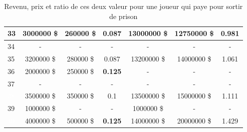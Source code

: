 \documentclass[letterpaper]{article}
\begin{document}
\begin{table}[htbp!]
\begin{tabular}{|l|c|c|c||c|c|c|}
	  \cellcolor[HTML]{2E8B57} 33 & 3000000 \$ & 260000 \$ & 0.087 & 13000000 \$ & 12750000 \$ & 0.981 \\ \hline
	  \cellcolor[HTML]{EEEED1} 34 & - & - & - & - & - & - \\ \hline
	  \cellcolor[HTML]{2E8B57} 35 & 3200000 \$ & 280000 \$ & 0.087 & 13200000 \$ & 14000000 \$ & 1.061 \\ \hline
	  \cellcolor[HTML]{E6E6FA} 36 & 2000000 \$ & 250000 \$ & \textbf{0.125} & - & - & - \\ \hline
	  \cellcolor[HTML]{FFC1C1} 37  & - & - & - & - & - & - \\ \hline
	  \cellcolor[HTML]{483D8B} \textcolor{white}{38} & 3500000 \$ & 350000 \$ & 0.1 & 13500000 \$ & 15000000 \$ & 1.111 \\ \hline
	  \cellcolor[HTML]{8B1A1A} 39  & 1000000 \$ & - & - & 1000000 \$ & - & - \\ \hline
	  \cellcolor[HTML]{483D8B} \textcolor{white}{40} & 4000000 \$ & 500000 \$ & \textbf{0.125} & 14000000 \$ & 20000000 \$ & 1.429 \\ \hline
	\end{tabular}
	
	\caption{Revenu, prix et ratio de ces deux valeur pour une joueur qui paye pour sortir de prison}
	\label{table:rentabilite_paye}
      \end{table}
      
\end{document}
